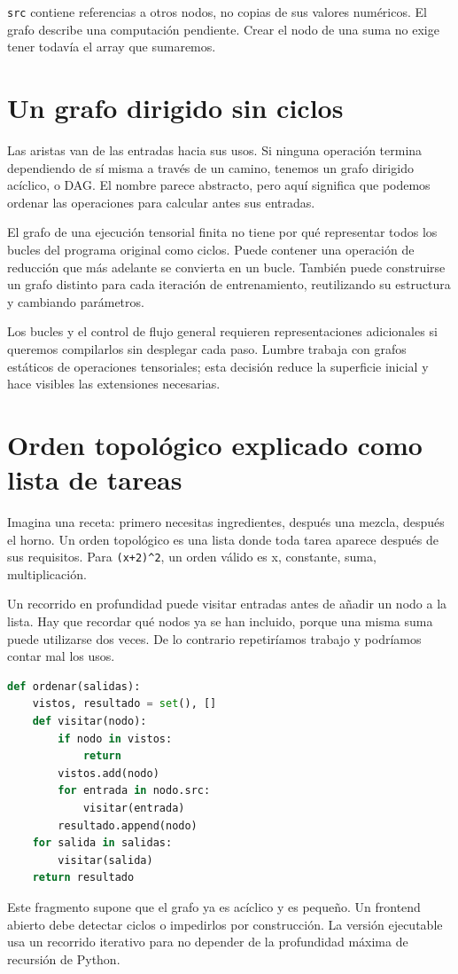 \documentclass[12pt,a4paper,oneside]{report}
\begin{document}
\texttt{src} contiene referencias a otros nodos, no copias de sus valores numéricos. El grafo describe una computación pendiente. Crear el nodo de una suma no exige tener todavía el array que sumaremos.

\section{Un grafo dirigido sin ciclos}
Las aristas van de las entradas hacia sus usos. Si ninguna operación termina dependiendo de sí misma a través de un camino, tenemos un grafo dirigido acíclico, o DAG. El nombre parece abstracto, pero aquí significa que podemos ordenar las operaciones para calcular antes sus entradas.

El grafo de una ejecución tensorial finita no tiene por qué representar todos los bucles del programa original como ciclos. Puede contener una operación de reducción que más adelante se convierta en un bucle. También puede construirse un grafo distinto para cada iteración de entrenamiento, reutilizando su estructura y cambiando parámetros.

Los bucles y el control de flujo general requieren representaciones adicionales si queremos compilarlos sin desplegar cada paso. Lumbre trabaja con grafos estáticos de operaciones tensoriales; esta decisión reduce la superficie inicial y hace visibles las extensiones necesarias.

\section{Orden topológico explicado como lista de tareas}
Imagina una receta: primero necesitas ingredientes, después una mezcla, después el horno. Un orden topológico es una lista donde toda tarea aparece después de sus requisitos. Para \texttt{(x+2)\textasciicircum{}2}, un orden válido es x, constante, suma, multiplicación.

Un recorrido en profundidad puede visitar entradas antes de añadir un nodo a la lista. Hay que recordar qué nodos ya se han incluido, porque una misma suma puede utilizarse dos veces. De lo contrario repetiríamos trabajo y podríamos contar mal los usos.

\begin{lstlisting}[language=Python]
def ordenar(salidas):
    vistos, resultado = set(), []
    def visitar(nodo):
        if nodo in vistos:
            return
        vistos.add(nodo)
        for entrada in nodo.src:
            visitar(entrada)
        resultado.append(nodo)
    for salida in salidas:
        visitar(salida)
    return resultado
\end{lstlisting}
Este fragmento supone que el grafo ya es acíclico y es pequeño. Un frontend abierto debe detectar ciclos o impedirlos por construcción. La versión ejecutable usa un recorrido iterativo para no depender de la profundidad máxima de recursión de Python.
\end{document}
